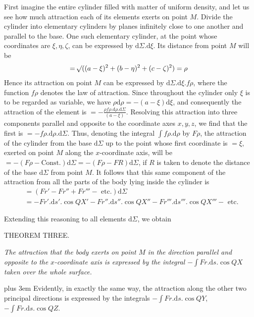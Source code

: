 \par
First imagine the entire cylinder filled with matter of uniform density, and let us see how much attraction each of its elements exerts on point $M$. Divide the cylinder into elementary cylinders by planes infinitely close to one another and parallel to the base. One such elementary cylinder, at the point whose coordinates are $\xi,\eta,\zeta$, can be expressed by $\mathrm{d}\Sigma.\mathrm{d}\xi$. Its distance from point $M$ will be
\[
=\mathord{{}^{}\!\surd}((a-\xi)^2+(b-\eta)^2+(c-\zeta)^2)=\rho
\]
Hence its attraction on point $M$ can be expressed by $\mathrm{d}\Sigma.\mathrm{d}\xi.f\rho$, where the function $f\rho$ denotes the law of attraction. Since throughout the cylinder only $\xi$ is to be regarded as variable, we have $\rho\mathrm{d}\rho=-(a-\xi)\mathrm{d}\xi$, and consequently the attraction of the element is $=-\frac{\rho f\rho.\mathrm{d}\rho.\mathrm{d}\Sigma}{(a-\xi)}$. Resolving this attraction into three components parallel and opposite to the coordinate axes $x,y,z$, we find that the first is $=-f\rho.\mathrm{d}\rho.\mathrm{d}\Sigma$. Thus, denoting the integral $\int f\rho.\mathrm{d}\rho$ by $F\rho$, the attraction of the cylinder from the base $\mathrm{d}\Sigma$ up to the point whose first coordinate is $=\xi$, exerted on point $M$ along the $x$-coordinate axis, will be $=-(F\rho-\mathrm{Const.})\mathrm{d}\Sigma=-(F\rho-FR)\mathrm{d}\Sigma$, if $R$ is taken to denote the distance of the base $\mathrm{d}\Sigma$ from point $M$. It follows that this same component of the attraction from all the parts of the body lying inside the cylinder is
\[
\begin{aligned}
&=(Fr'-Fr''+Fr'''-\text{ etc.})\mathrm{d}\Sigma\\
&=-Fr'.\mathrm{d}s'.\cos QX'-Fr''.\mathrm{d}s''.\cos QX''-Fr'''.\mathrm{d}s'''.\cos QX'''-\text{ etc.}
\end{aligned}
\]
\par
Extending this reasoning to all elements $\mathrm{d}\Sigma$, we obtain
\par\medskip{}
\begin{center}THEOREM THREE.\end{center}
\par
\textit{The attraction that the body exerts on point $M$ in the direction parallel and opposite to the $x$-coordinate axis is expressed by the integral $-\int Fr.\mathrm{d}s.\cos QX$ taken over the whole surface.}
\par
{\rightskip=0pt plus 3em Evidently, in exactly the same way, the attraction along the other two principal directions is expressed by the integrals $-\int Fr.\mathrm{d}s.\cos QY$, $-\int Fr.\mathrm{d}s.\cos QZ$.\par}

